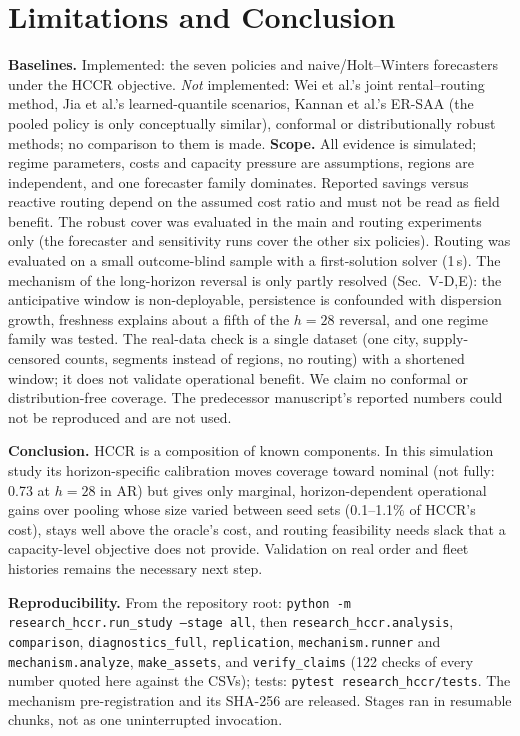 \documentclass[conference]{IEEEtran}
\begin{document}
\section{Limitations and Conclusion}
\textbf{Baselines.} Implemented: the seven policies and naive/Holt--Winters forecasters under the HCCR objective. \emph{Not} implemented: Wei et al.'s joint rental--routing method, Jia et al.'s learned-quantile scenarios, Kannan et al.'s ER-SAA (the pooled policy is only conceptually similar), conformal or distributionally robust methods; no comparison to them is made. \textbf{Scope.} All evidence is simulated; regime parameters, costs and capacity pressure are assumptions, regions are independent, and one forecaster family dominates. Reported savings versus reactive routing depend on the assumed cost ratio and must not be read as field benefit. The robust cover was evaluated in the main and routing experiments only (the forecaster and sensitivity runs cover the other six policies). Routing was evaluated on a small outcome-blind sample with a first-solution solver (1\,s). The mechanism of the long-horizon reversal is only partly resolved (Sec.~V-D,E): the anticipative window is non-deployable, persistence is confounded with dispersion growth, freshness explains about a fifth of the $h{=}28$ reversal, and one regime family was tested. The real-data check is a single dataset (one city, supply-censored counts, segments instead of regions, no routing) with a shortened window; it does not validate operational benefit. We claim no conformal or distribution-free coverage. The predecessor manuscript's reported numbers could not be reproduced and are not used.

\textbf{Conclusion.} HCCR is a composition of known components. In this simulation study its horizon-specific calibration moves coverage toward nominal (not fully: 0.73 at $h{=}28$ in AR) but gives only marginal, horizon-dependent operational gains over pooling whose size varied between seed sets (0.1--1.1\% of HCCR's cost), stays well above the oracle's cost, and routing feasibility needs slack that a capacity-level objective does not provide. Validation on real order and fleet histories remains the necessary next step.

\textbf{Reproducibility.} From the repository root: \texttt{python -m research\_hccr.run\_study --stage all}, then \texttt{research\_hccr.analysis}, \texttt{comparison}, \texttt{diagnostics\_full}, \texttt{replication}, \texttt{mechanism.runner} and \texttt{mechanism.analyze}, \texttt{make\_assets}, and \texttt{verify\_claims} (122 checks of every number quoted here against the CSVs); tests: \texttt{pytest research\_hccr/tests}. The mechanism pre-registration and its SHA-256 are released. Stages ran in resumable chunks, not as one uninterrupted invocation.



\end{document}
